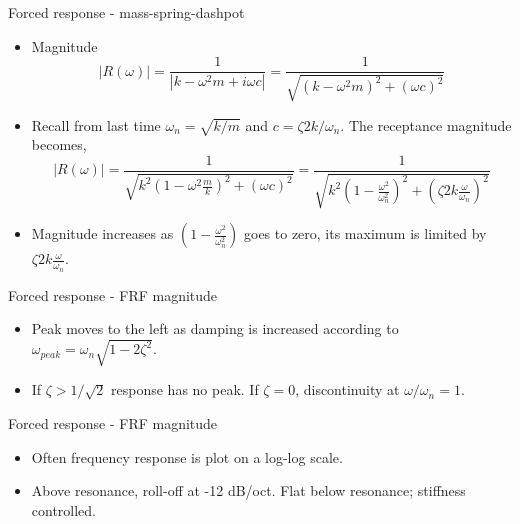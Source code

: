 \documentclass[11pt,aspectratio=169,handout]{beamer}
\begin{document}
\begin{frame}[c]{Forced response - mass-spring-dashpot}
	\begin{itemize}
	\item<1-> Magnitude 
			\begin{equation}
		|R(\omega)| =  \frac{1}{|k - \omega^2 m+ i\omega c |} =  \frac{1}{\sqrt{(k - \omega^2 m)^2+ (\omega c)^2}} 
	\end{equation}
\item<2-> Recall from last time $\omega_n = \sqrt{k/m}$ and $c = \zeta 2 k/ \omega_n$. The receptance magnitude becomes, 
			\begin{equation}
	|R(\omega)| =  \frac{1}{\sqrt{k^2\left(1 - \omega^2 \frac{m}{k}\right)^2+ (\omega c)^2}} = \frac{1}{\sqrt{k^2\left(1 - \frac{\omega^2}{\omega_n^2}\right)^2+ \left( \zeta 2 k \frac{\omega}{\omega_n}\right)^2}}
\end{equation}
\item<3-> Magnitude increases as $\left(1 - \frac{\omega^2}{\omega_n^2}\right)$ goes to zero, its maximum is limited by $  \zeta 2 k \frac{\omega}{\omega_n}$.
	\end{itemize}
\end{frame}


\begin{frame}[c]{Forced response - FRF magnitude}
	\begin{itemize}
		\item<1-> Peak moves to the left as damping is increased according to $\omega_{peak} = \omega_n\sqrt{1-2\zeta^2}$.
		\item<2-> If $\zeta>1/\sqrt{2}$ response has no peak. If $\zeta=0$, discontinuity at $\omega/\omega_n = 1$.
	\end{itemize}
	\begin{figure}
	
\end{figure}
\end{frame}


\begin{frame}[c]{Forced response - FRF magnitude}
	\begin{itemize}
		\item<1-> Often frequency response is plot on a log-log scale. 
		\item<1-> Above resonance, roll-off at -12 dB/oct. Flat below resonance; stiffness controlled. 
	\end{itemize}
	\begin{figure}
		
	\end{figure}
\end{frame}
\end{document}
